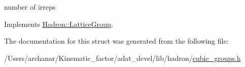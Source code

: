 number of irreps 

Implements \mbox{\hyperlink{structHadron_1_1LatticeGroup_a3edaca488144b5d2a9cf73fe653add34}{Hadron\+::\+Lattice\+Group}}.



The documentation for this struct was generated from the following file\+:\begin{DoxyCompactItemize}
\item 
/\+Users/archanar/\+Kinematic\+\_\+factor/adat\+\_\+devel/lib/hadron/\mbox{\hyperlink{lib_2hadron_2cubic__groups_8h}{cubic\+\_\+groups.\+h}}\end{DoxyCompactItemize}
